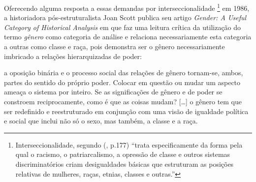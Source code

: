 
Oferecendo alguma resposta a essas demandas por interseccionalidade
\footnote{Interseccionalidade, segundo  (\citeyear{CRENSHAW2002}, p.177) ``trata especificamente da forma pela qual o racismo, o patriarcalismo, a opressão de classe e outros sistemas discriminatórios criam desigualdades básicas que estruturam as posições relativas de mulheres, raças, etnias, classes e outras.''} em 1986, a historiadora pós-estruturalista Joan Scott publica seu artigo \emph{Gender: A Useful Category of Historical Analysis} em que faz uma leitura crítica da utilização do termo \emph{gênero} como categoria de análise e relaciona necessariamente esta categoria a outras como classe e raça, pois demonstra ser o gênero necessariamente imbricado a relações hierarquizadas de poder:

\begin{citacao}
a oposição binária e o processo social das relações de gênero tornam-se,
ambos, partes do sentido do próprio poder. Colocar em questão ou mudar um aspecto ameaça o sistema por inteiro. Se as significações de gênero e de poder se constroem reciprocamente, como é que as coisas mudam? [\ldots] o gênero tem que ser redefinido e reestruturado em conjunção com uma visão de igualdade política e social que inclui não só o sexo, mas também, a classe e a raça. \cite[p.1073,1075]{SCOTT1986}
\end{citacao}



